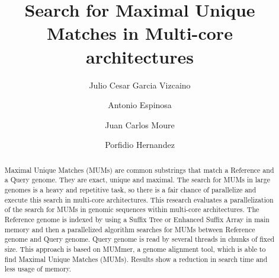 \documentclass[runningheads,a4paper]{llncs}
\begin{document}
\mainmatter

\title{Search for Maximal Unique Matches in Multi-core architectures}
\author{Julio Cesar Garcia Vizcaino \and Antonio Espinosa \and Juan Carlos Moure \and Porfidio Hernandez }
 

\maketitle
\begin{center}
  \mailsa

  \mailsb
\end{center}

\begin{abstract}
  Maximal Unique Matches (MUMs) are common substrings that match a Reference and a Query genome. They are exact, unique and maximal. The search for MUMs in large genomes is a heavy and repetitive task, so there is a fair chance of parallelize and execute this search in multi-core architectures. This research evaluates a parallelization of the search for MUMs in genomic sequences within multi-core architectures. The Reference genome is indexed by using a Suffix Tree or Enhanced Suffix Array in main memory and then a parallelized algorithm searches for MUMs between Reference genome and Query genome. Query genome is read by several threads in chunks of fixed size. This approach is based on MUMmer, a genome alignment tool, which is able to find Maximal Unique Matches (MUMs). Results show a reduction in search time and less usage of memory.

\end{abstract}
\end{document}
